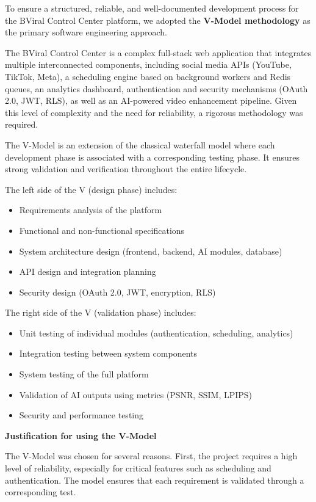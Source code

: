 To ensure a structured, reliable, and well-documented development process for the BViral Control Center platform, we adopted the \textbf{V-Model methodology} as the primary software engineering approach.

The BViral Control Center is a complex full-stack web application that integrates multiple interconnected components, including social media APIs (YouTube, TikTok, Meta), a scheduling engine based on background workers and Redis queues, an analytics dashboard, authentication and security mechanisms (OAuth 2.0, JWT, RLS), as well as an AI-powered video enhancement pipeline. Given this level of complexity and the need for reliability, a rigorous methodology was required.

The V-Model is an extension of the classical waterfall model where each development phase is associated with a corresponding testing phase. It ensures strong validation and verification throughout the entire lifecycle.

The left side of the V (design phase) includes:
\begin{itemize}
    \item Requirements analysis of the platform
    \item Functional and non-functional specifications
    \item System architecture design (frontend, backend, AI modules, database)
    \item API design and integration planning
    \item Security design (OAuth 2.0, JWT, encryption, RLS)
\end{itemize}

The right side of the V (validation phase) includes:
\begin{itemize}
    \item Unit testing of individual modules (authentication, scheduling, analytics)
    \item Integration testing between system components
    \item System testing of the full platform
    \item Validation of AI outputs using metrics (PSNR, SSIM, LPIPS)
    \item Security and performance testing
\end{itemize}

\textbf{Justification for using the V-Model}

The V-Model was chosen for several reasons. First, the project requires a high level of reliability, especially for critical features such as scheduling and authentication. The model ensures that each requirement is validated through a corresponding test.

